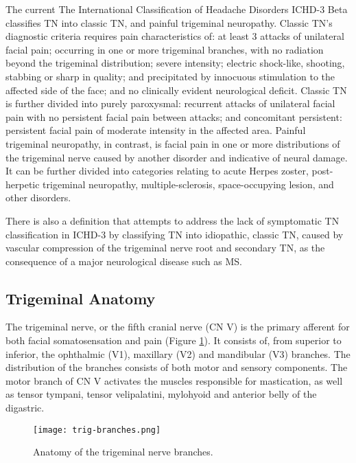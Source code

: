 The current The International Classification of Headache Disorders ICHD-3 Beta \cite{Society2013} classifies TN into classic TN, and painful trigeminal neuropathy. 
Classic TN's diagnostic criteria requires pain characteristics of: at least 3 attacks of unilateral facial pain; occurring in one or more trigeminal branches, with no radiation beyond the trigeminal distribution; severe intensity; electric shock-like, shooting, stabbing or sharp in quality; and precipitated by innocuous stimulation to the affected side of the face; and no clinically evident neurological deficit. Classic TN is further divided into purely paroxysmal: recurrent attacks of unilateral facial pain with no persistent facial pain between attacks; and concomitant persistent: persistent facial pain of moderate intensity in the affected area. 
Painful trigeminal neuropathy, in contrast, is facial pain in one or more distributions of the trigeminal nerve caused by another disorder and indicative of neural damage. It can be further divided into categories relating to acute Herpes zoster, post-herpetic trigeminal neuropathy, multiple-sclerosis, space-occupying lesion, and other disorders.

There is also a definition \cite{Zakrzewska2016} that attempts to address the lack of symptomatic TN classification in ICHD-3 by classifying TN into idiopathic, classic TN, caused by vascular compression of the trigeminal nerve root and secondary TN, as the consequence of a major neurological disease such as MS. 

\subsection{Trigeminal Anatomy}

The trigeminal nerve, or the fifth cranial nerve (CN V) is the primary afferent for both facial somatosensation and pain (Figure \ref{fig:trig-branches}). It consists of, from superior to inferior, the ophthalmic (V1), maxillary (V2) and mandibular (V3) branches. The distribution of the branches consists of both motor and sensory components. The motor branch of CN V activates the muscles responsible for mastication, as well as tensor tympani, tensor velipalatini, mylohyoid and anterior belly of the digastric. 

 \begin{figure}[ht]
 \texttt{[image: trig-branches.png]}
 \centering
 \caption{Anatomy of the trigeminal nerve branches. \protect\cite{gray1918anatomy}} 
 \label{fig:trig-branches} 
 \end{figure}
 
